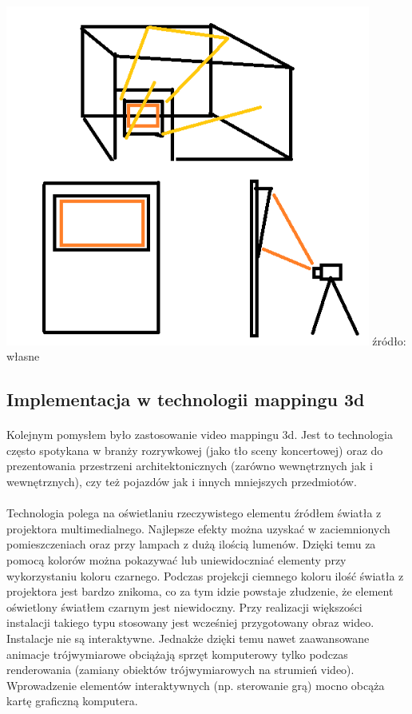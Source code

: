\begin{center}
\includegraphics[width=0.9\textwidth]{images/hologramv1.png}
\small {źródło: własne }
\end{center}

\subsection{Implementacja w technologii mappingu 3d}
\paragraph{}
Kolejnym pomysłem było zastosowanie video mappingu 3d. Jest to technologia często spotykana w branży rozrywkowej (jako tło sceny koncertowej) oraz do prezentowania przestrzeni architektonicznych (zarówno wewnętrznych jak i wewnętrznych), czy też pojazdów jak i innych mniejszych przedmiotów. 
\paragraph{}
Technologia polega na oświetlaniu rzeczywistego elementu  źródłem światła z projektora multimedialnego. Najlepsze efekty można uzyskać w zaciemnionych pomieszczeniach oraz przy lampach z dużą ilością lumenów. Dzięki temu za pomocą kolorów można pokazywać lub uniewidoczniać elementy przy wykorzystaniu koloru czarnego. Podczas projekcji ciemnego koloru ilość światła z projektora jest bardzo znikoma, co za tym idzie powstaje złudzenie, że element oświetlony światłem czarnym jest niewidoczny.
Przy realizacji większości instalacji takiego typu stosowany jest wcześniej przygotowany obraz wideo. Instalacje nie są interaktywne. Jednakże dzięki temu nawet zaawansowane animacje trójwymiarowe obciążają sprzęt komputerowy tylko podczas renderowania (zamiany obiektów trójwymiarowych na strumień video). Wprowadzenie elementów interaktywnych (np. sterowanie grą) mocno obcąża kartę graficzną komputera.
